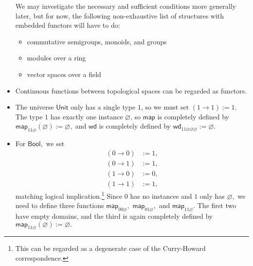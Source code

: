 \documentclass[a4paper]{article}
\theoremstyle{definition}
\theoremstyle{remark}
\renewcommand{\emptyset}{\varnothing}
\newcommand{\nm}{\mathsf}
\newcommand{\universe}{\nm}
\newcommand{\Unit}{\universe{Unit}}
\newcommand{\Bool}{\universe{Bool}}
\newcommand{\map}{\nm{map}}
\newcommand{\congrArg}{\nm{wd}}
\begin{document}
\begin{itemize}
  We may investigate the necessary and sufficient conditions more generally later, but for
  now, the following non-exhaustive list of structures with embedded functors will have to
  do:
  \begin{itemize}
    \item commutative semigroups, monoids, and groups
    \item modules over a ring
    \item vector spaces over a field
  \end{itemize}
  \item Continuous functions between topological spaces can be regarded as functors.
  \item The universe $\Unit$ only has a single type $1$, so we must set $(1 \to 1) := 1.$
  The type $1$ has exactly one instance $\emptyset$, so $\map$ is completely
  defined by $\map_{11\emptyset}(\emptyset) := \emptyset,$ and $\congrArg$ is completely
  defined by $\congrArg_{11\emptyset\emptyset\emptyset} := \emptyset.$
  \item For $\Bool,$ we set
  \begin{align*}
    (0 \to 0) &:= 1,\\
    (0 \to 1) &:= 1,\\
    (1 \to 0) &:= 0,\\
    (1 \to 1) &:= 1,
  \end{align*}
  matching logical implication.\footnote{This can be regarded as a degenerate case of
  the Curry-Howard correspondence.} Since $0$ has no instances and $1$ only has
  $\emptyset,$ we need to define three functions $\map_{00\emptyset},$
  $\map_{01\emptyset},$ and $\map_{11\emptyset}.$ The first two have empty domains,
  and the third is again completely defined by
  $\map_{11\emptyset}(\emptyset) := \emptyset.$
\end{itemize}
\end{document}

